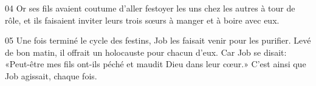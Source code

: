 
04 Or ses fils avaient coutume d’aller festoyer les uns chez les autres à tour de rôle, et ils faisaient inviter leurs trois sœurs à manger et à boire avec eux.

05 Une fois terminé le cycle des festins, Job les faisait venir pour les purifier. Levé de bon matin, il offrait un holocauste pour chacun d’eux. Car Job se disait: «Peut-être mes fils ont-ils péché et maudit Dieu dans leur cœur.» C’est ainsi que Job agissait, chaque fois.
